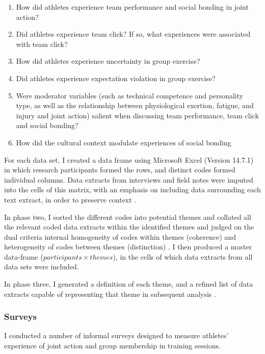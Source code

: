 \begin{CJK}{UTF8}{gbsn}
\begin{enumerate}
  \item How did athletes experience team performance and social bonding in joint action?
  \item Did athletes experience team click? If so, what experiences were associated with team click?
  \item How did athletes experience uncertainty in group exercise?
  \item Did athletes experience expectation violation in group exercise?
  \item Were moderator variables (such as technical competence and personality type, as well as the relationship between physiological exertion, fatigue, and injury and joint action) salient when discussing team performance, team click and social bonding?
  \item How did the cultural context modulate experiences of social bonding
\end{enumerate}

For each data set, I created a data frame using Microsoft Excel (Version 14.7.1) in which research participants formed the rows, and distinct codes formed individual columns. Data extracts from interviews and field notes were imputed into the cells of this matrix, with an emphasis on including data surrounding each text extract, in order to preserve context \citep[see][]{Bryman2001}.

In phase two, I sorted the different codes into potential themes and collated all the relevant coded data extracts within the identified themes and judged on the dual criteria internal homogeneity of codes within themes (coherence) and heterogeneity of codes between themes (distinction) \citep{Patton1990}.  I then produced a master data-frame ($ participants \times themes$), in the cells of which data extracts from all data sets were included.

In phase three, I generated a definition of each theme, and a refined list of data extracts capable of representing that theme in subsequent analysis \citep{Braun2006}.




\subsubsection{Surveys\label{sect:procSurveys}}

 I conducted a number of informal surveys designed to measure athletes' experience of joint action and group membership in training sessions.


\end{CJK}
